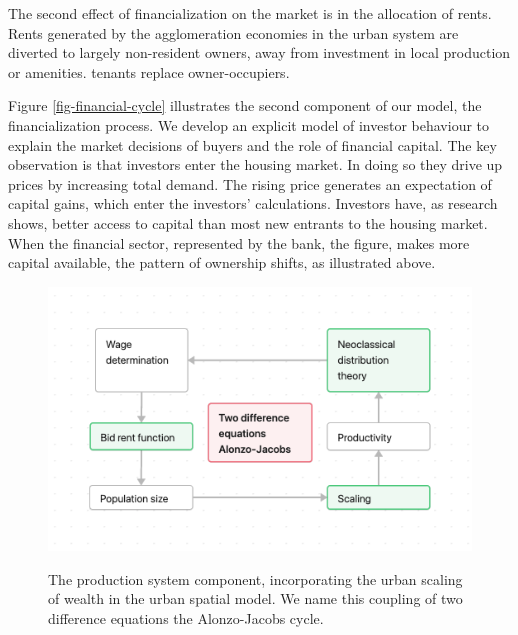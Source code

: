 The second effect of financialization on the market is in the allocation of rents. Rents generated by the agglomeration economies in the urban system are diverted to largely non-resident owners, away from investment in local production or amenities. tenants replace owner-occupiers. %


Figure \ref{fig-financial-cycle} illustrates the second component of our model, the financialization process. We develop an explicit model of investor behaviour to explain the market decisions of buyers and the role of financial capital. 
The key observation is that investors enter the housing market. In doing so they drive up prices by increasing total demand. The rising price generates an expectation of capital gains, which enter the investors' calculations. Investors have, as research shows, better access to capital than most new entrants to the housing market. When the financial sector, represented by the bank, the figure, %
makes more capital available, the pattern of ownership shifts, as illustrated above. %

\begin{figure}[!ht]
    \centering
    \includegraphics[scale=.7]{fig/flow_Alonzo-Jacobs_cycle.png}
    \label{fig-Alonzo-Jacobs-cycle}
\caption[Production system.]{The production system component, incorporating the urban scaling of wealth in the urban spatial model. We name this coupling of two difference equations the Alonzo-Jacobs cycle.}
\end{figure}

